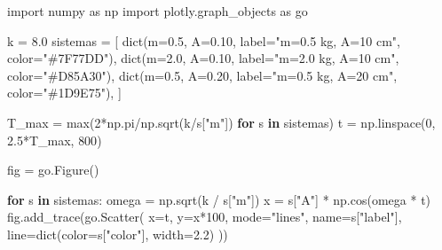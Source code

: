 \documentclass[
  letterpaper,
  DIV=11,
  numbers=noendperiod]{scrreprt}
\newenvironment{Shaded}{\begin{snugshade}}{\end{snugshade}}
\newcommand{\BuiltInTok}[1]{\textcolor[rgb]{0.00,0.23,0.31}{#1}}
\newcommand{\ControlFlowTok}[1]{\textcolor[rgb]{0.00,0.23,0.31}{\textbf{#1}}}
\newcommand{\DecValTok}[1]{\textcolor[rgb]{0.68,0.00,0.00}{#1}}
\newcommand{\FloatTok}[1]{\textcolor[rgb]{0.68,0.00,0.00}{#1}}
\newcommand{\ImportTok}[1]{\textcolor[rgb]{0.00,0.46,0.62}{#1}}
\newcommand{\KeywordTok}[1]{\textcolor[rgb]{0.00,0.23,0.31}{\textbf{#1}}}
\newcommand{\NormalTok}[1]{\textcolor[rgb]{0.00,0.23,0.31}{#1}}
\newcommand{\OperatorTok}[1]{\textcolor[rgb]{0.37,0.37,0.37}{#1}}
\newcommand{\StringTok}[1]{\textcolor[rgb]{0.13,0.47,0.30}{#1}}
\begin{document}
\begin{Shaded}
\begin{Highlighting}[]
\ImportTok{import}\NormalTok{ numpy }\ImportTok{as}\NormalTok{ np}
\ImportTok{import}\NormalTok{ plotly.graph\_objects }\ImportTok{as}\NormalTok{ go}

\NormalTok{k }\OperatorTok{=} \FloatTok{8.0}
\NormalTok{sistemas }\OperatorTok{=}\NormalTok{ [}
    \BuiltInTok{dict}\NormalTok{(m}\OperatorTok{=}\FloatTok{0.5}\NormalTok{,  A}\OperatorTok{=}\FloatTok{0.10}\NormalTok{, label}\OperatorTok{=}\StringTok{"m=0.5 kg, A=10 cm"}\NormalTok{, color}\OperatorTok{=}\StringTok{"\#7F77DD"}\NormalTok{),}
    \BuiltInTok{dict}\NormalTok{(m}\OperatorTok{=}\FloatTok{2.0}\NormalTok{,  A}\OperatorTok{=}\FloatTok{0.10}\NormalTok{, label}\OperatorTok{=}\StringTok{"m=2.0 kg, A=10 cm"}\NormalTok{, color}\OperatorTok{=}\StringTok{"\#D85A30"}\NormalTok{),}
    \BuiltInTok{dict}\NormalTok{(m}\OperatorTok{=}\FloatTok{0.5}\NormalTok{,  A}\OperatorTok{=}\FloatTok{0.20}\NormalTok{, label}\OperatorTok{=}\StringTok{"m=0.5 kg, A=20 cm"}\NormalTok{, color}\OperatorTok{=}\StringTok{"\#1D9E75"}\NormalTok{),}
\NormalTok{]}

\NormalTok{T\_max }\OperatorTok{=} \BuiltInTok{max}\NormalTok{(}\DecValTok{2}\OperatorTok{*}\NormalTok{np.pi}\OperatorTok{/}\NormalTok{np.sqrt(k}\OperatorTok{/}\NormalTok{s[}\StringTok{"m"}\NormalTok{]) }\ControlFlowTok{for}\NormalTok{ s }\KeywordTok{in}\NormalTok{ sistemas)}
\NormalTok{t     }\OperatorTok{=}\NormalTok{ np.linspace(}\DecValTok{0}\NormalTok{, }\FloatTok{2.5}\OperatorTok{*}\NormalTok{T\_max, }\DecValTok{800}\NormalTok{)}

\NormalTok{fig }\OperatorTok{=}\NormalTok{ go.Figure()}

\ControlFlowTok{for}\NormalTok{ s }\KeywordTok{in}\NormalTok{ sistemas:}
\NormalTok{    omega }\OperatorTok{=}\NormalTok{ np.sqrt(k }\OperatorTok{/}\NormalTok{ s[}\StringTok{"m"}\NormalTok{])}
\NormalTok{    x     }\OperatorTok{=}\NormalTok{ s[}\StringTok{"A"}\NormalTok{] }\OperatorTok{*}\NormalTok{ np.cos(omega }\OperatorTok{*}\NormalTok{ t)}
\NormalTok{    fig.add\_trace(go.Scatter(}
\NormalTok{        x}\OperatorTok{=}\NormalTok{t, y}\OperatorTok{=}\NormalTok{x}\OperatorTok{*}\DecValTok{100}\NormalTok{,}
\NormalTok{        mode}\OperatorTok{=}\StringTok{"lines"}\NormalTok{, name}\OperatorTok{=}\NormalTok{s[}\StringTok{"label"}\NormalTok{],}
\NormalTok{        line}\OperatorTok{=}\BuiltInTok{dict}\NormalTok{(color}\OperatorTok{=}\NormalTok{s[}\StringTok{"color"}\NormalTok{], width}\OperatorTok{=}\FloatTok{2.2}\NormalTok{)}
\NormalTok{    ))}


\end{Highlighting}
\end{Shaded}
\end{document}
